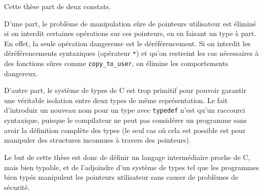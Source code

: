
Cette thèse part de deux constats.

D'une part, le problème de manipulation sûre de pointeurs utilisateur est
éliminé si on interdit certaines opérations sur ces pointeurs, en en faisant un
type à part. En effet, la seule opération dangereuse est le déréférencement. Si
on interdit les déréférencements syntaxiques (opérateur \texttt{*}) et qu'on
restreint les cas nécessaires à des fonctions sûres comme
\texttt{copy\_to\_user}, on élimine les comportements dangereux.

D'autre part, le système de types de C est trop primitif pour pouvoir
garantir une véritable isolation entre deux types de même représentation. Le
fait d'introduir un nouveau nom pour un type avec \texttt{typedef} n'est qu'un
raccourci syntaxique, puisque le compilateur ne peut pas considérer un programme
sans avoir la définition complète des types (le seul cas où cela est possible
est pour manipuler des structures inconnues à travers des pointeurs).

Le but de cette thèse est donc de définir un langage intermédiaire proche de C,
mais bien typable, et de l'adjoindre d'un système de types tel que les
programmes bien typés manipulent les pointeurs utilisateur sans causer de
problèmes de sécurité.
